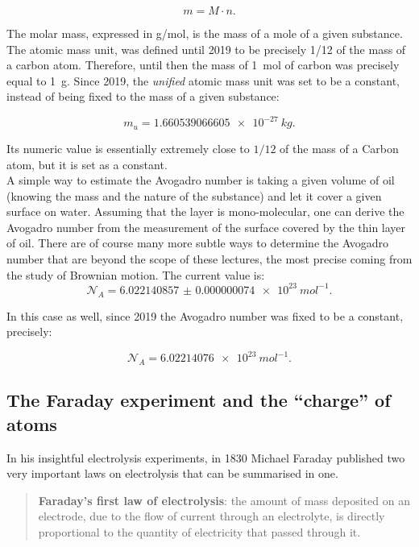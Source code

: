 $$m = M \cdot n.$$ 

The molar mass, expressed in \si{g/mol}, is the mass of a mole of a given substance. \\

The atomic mass unit, was defined until 2019 to be precisely 1/12 of the mass of a carbon atom. Therefore, until then the mass of \SI{1}{mol} of carbon was precisely equal to \SI{1}{g}. Since 2019, the {\it unified} atomic mass unit was set to be a constant, instead of being fixed to the mass of a given substance:

$$m_u = \SI{1.660539066605e-27}{kg}.$$ %

Its numeric value is essentially extremely close to $1/12$ of the mass of a Carbon atom, but it is set as a constant.\\

A simple way to estimate the Avogadro number is taking a given volume of oil (knowing the mass and the nature of the substance) and let it cover a given surface on water. Assuming that the layer is mono-molecular, one can derive the Avogadro number from the measurement of the surface covered by the thin layer of oil. There are of course many more subtle ways to determine the Avogadro number that are beyond the scope of these lectures, the most precise coming from the study of Brownian motion. The current value is:
\begin{equation}
    {\mathcal N}_A = \SI{6.022140857(74)e23}{mol^{-1}}.%
\end{equation}

In this case as well, since 2019 the Avogadro number was fixed to be a constant, precisely:

\begin{equation}
    {\mathcal N}_A = \SI{6.02214076e23}{mol^{-1}}.
\end{equation}

\subsection{The Faraday experiment and the ``charge'' of atoms}

In his insightful electrolysis experiments, in 1830 Michael Faraday published two very important laws on electrolysis that can be summarised in one. \\

\begin{quote}
{\bf Faraday's first law of electrolysis}: the amount of mass deposited on an electrode, due to the flow of current through an electrolyte, is directly proportional to the quantity of electricity that passed through it.
\end{quote}

